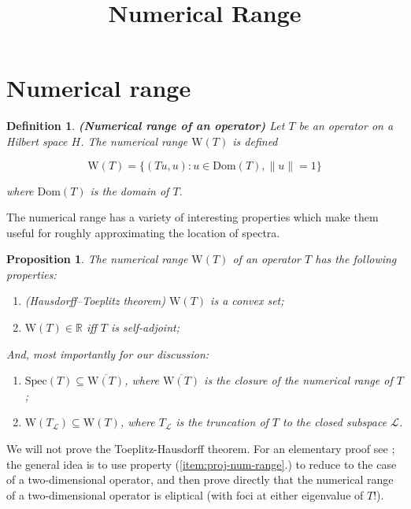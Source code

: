 \documentclass{article}
\title{Numerical Range}
\newcommand{\Num}{\text{W}}
\newcommand{\Spec}{\text{Spec}}
\newcommand{\Dom}{\text{Dom}}
\newtheorem{definition}{Definition}
\newtheorem{proposition}{Proposition}[section]
\begin{document}
\maketitle

\section{Numerical range}

\begin{definition}{\textbf{(Numerical range of an operator)}} Let $T$ be an operator on a Hilbert space $H$. The
numerical range $\Num(T)$ is defined

$$\Num(T) = \{( Tu, u ) : u \in \Dom(T), \|u\|=1\}$$

where $\text{Dom}(T)$ is the domain of $T$.
\end{definition}

The numerical range has a variety of interesting properties which make them useful for roughly approximating
the location of spectra.

\begin{proposition}\label{thm:num-range-props}
The numerical range $\Num(T)$ of an operator $T$ has the following properties:
\begin{enumerate}
\item (Hausdorff–Toeplitz theorem) $\Num(T)$ is a convex set;
\item\label{item:num-in-R} $\Num(T) \in \mathbb{R}$ iff $T$ is self-adjoint;
\end{enumerate}
And, most importantly for our discussion:
\begin{enumerate}[resume]
\item\label{item:spec-in-num} $\Spec(T) \subseteq \overline{\Num(T)}$, where $\overline{\Num(T)}$ is the closure of the numerical range of $T$;
\item\label{item:proj-num-range} $\Num(T_\mathcal{L}) \subseteq \Num(T)$, where $T_\mathcal{L}$ is the truncation of $T$ to the closed subspace $\mathcal{L}$.
\end{enumerate}
\end{proposition}

We will not prove the Toeplitz-Hausdorff theorem. For an elementary proof see \cite{gustafson1997numerical}; the general idea
is to use property (\ref{item:proj-num-range}.) to reduce to the case of a two-dimensional operator, and then prove directly that the numerical range of a two-dimensional
operator is eliptical (with foci at either eigenvalue of $T$!).
\end{document}
